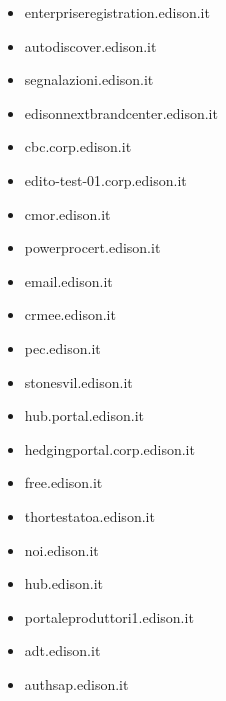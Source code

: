 \documentclass{article}
\begin{document}
\begin{itemize}
            \item enterpriseregistration.edison.it
        
            \item autodiscover.edison.it
        
            \item segnalazioni.edison.it
        
            \item edisonnextbrandcenter.edison.it
        
            \item cbc.corp.edison.it
        
            \item edito-test-01.corp.edison.it
        
            \item cmor.edison.it
        
            \item powerprocert.edison.it
        
            \item email.edison.it
        
            \item crmee.edison.it
        
            \item pec.edison.it
        
            \item stonesvil.edison.it
        
            \item hub.portal.edison.it
        
            \item hedgingportal.corp.edison.it
        
            \item free.edison.it
        
            \item thortestatoa.edison.it
        
            \item noi.edison.it
        
            \item hub.edison.it
        
            \item portaleproduttori1.edison.it
        
            \item adt.edison.it
        
            \item authsap.edison.it
        

\end{itemize}
\end{document}
